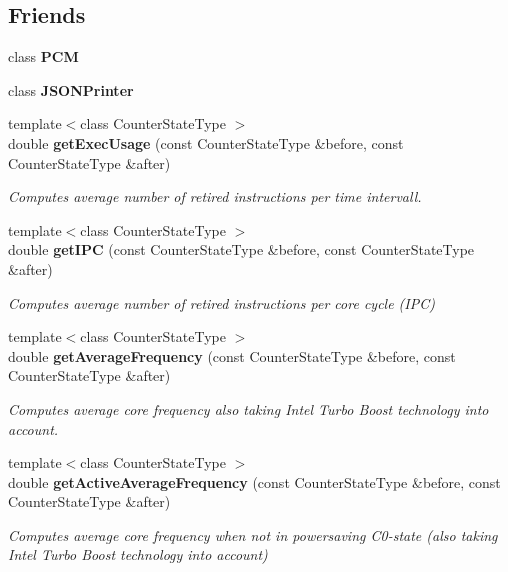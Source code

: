 \subsection*{Friends}
\begin{DoxyCompactItemize}
\item 
\mbox{\label{classBasicCounterState_ab5f56d2e95ba3daf52c17b8a1d356d64}} 
class {\bfseries P\+CM}
\item 
\mbox{\label{classBasicCounterState_a9dd7d40a5a10fa8976f8eb55a9889f38}} 
class {\bfseries J\+S\+O\+N\+Printer}
\item 
{\footnotesize template$<$class Counter\+State\+Type $>$ }\\double \textbf{ get\+Exec\+Usage} (const Counter\+State\+Type \&before, const Counter\+State\+Type \&after)
\begin{DoxyCompactList}\small\item\em Computes average number of retired instructions per time intervall. \end{DoxyCompactList}\item 
{\footnotesize template$<$class Counter\+State\+Type $>$ }\\double \textbf{ get\+I\+PC} (const Counter\+State\+Type \&before, const Counter\+State\+Type \&after)
\begin{DoxyCompactList}\small\item\em Computes average number of retired instructions per core cycle (I\+PC) \end{DoxyCompactList}\item 
{\footnotesize template$<$class Counter\+State\+Type $>$ }\\double \textbf{ get\+Average\+Frequency} (const Counter\+State\+Type \&before, const Counter\+State\+Type \&after)
\begin{DoxyCompactList}\small\item\em Computes average core frequency also taking Intel Turbo Boost technology into account. \end{DoxyCompactList}\item 
{\footnotesize template$<$class Counter\+State\+Type $>$ }\\double \textbf{ get\+Active\+Average\+Frequency} (const Counter\+State\+Type \&before, const Counter\+State\+Type \&after)
\begin{DoxyCompactList}\small\item\em Computes average core frequency when not in powersaving C0-\/state (also taking Intel Turbo Boost technology into account) \end{DoxyCompactList}\item 

\end{DoxyCompactItemize}
